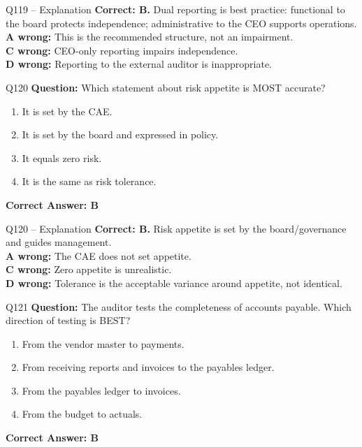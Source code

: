 \documentclass[aspectratio=169,10pt]{beamer}
\begin{document}
	\begin{frame}[t]{Q119 -- Explanation}
		\small
		\textbf{Correct: B.} Dual reporting is best practice: functional to the board protects independence; administrative to the CEO supports operations. \\[4pt]
		\textbf{A wrong:} This is the recommended structure, not an impairment. \\[2pt]
		\textbf{C wrong:} CEO-only reporting impairs independence. \\[2pt]
		\textbf{D wrong:} Reporting to the external auditor is inappropriate.
	\end{frame}
	
	\begin{frame}[t]{Q120}
		\small
		\textbf{Question:} Which statement about risk appetite is MOST accurate?
		\begin{enumerate}[label=\Alph*.,itemsep=1pt,topsep=2pt]
			\item It is set by the CAE.
			\item It is set by the board and expressed in policy.
			\item It equals zero risk.
			\item It is the same as risk tolerance.
		\end{enumerate}
		\vspace{4pt}
		\textbf{Correct Answer: B}
	\end{frame}
	
	\begin{frame}[t]{Q120 -- Explanation}
		\small
		\textbf{Correct: B.} Risk appetite is set by the board/governance and guides management. \\[4pt]
		\textbf{A wrong:} The CAE does not set appetite. \\[2pt]
		\textbf{C wrong:} Zero appetite is unrealistic. \\[2pt]
		\textbf{D wrong:} Tolerance is the acceptable variance around appetite, not identical.
	\end{frame}
	
	\begin{frame}[t]{Q121}
		\small
		\textbf{Question:} The auditor tests the completeness of accounts payable. Which direction of testing is BEST?
		\begin{enumerate}[label=\Alph*.,itemsep=1pt,topsep=2pt]
			\item From the vendor master to payments.
			\item From receiving reports and invoices to the payables ledger.
			\item From the payables ledger to invoices.
			\item From the budget to actuals.
		\end{enumerate}
		\vspace{4pt}
		\textbf{Correct Answer: B}
	\end{frame}
	
\end{document}
